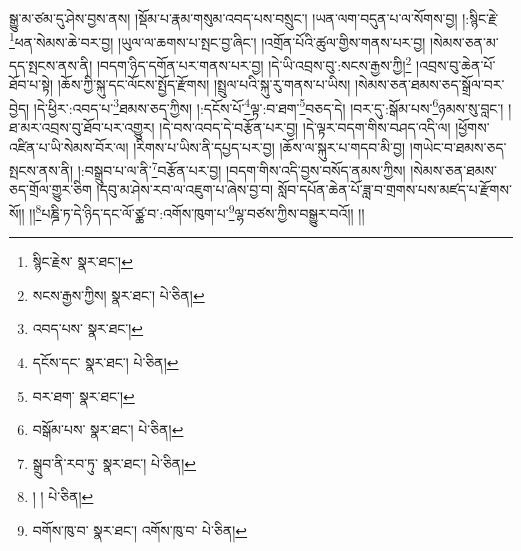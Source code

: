 སྒྱུ་མ་ཙམ་དུ་ཤེས་བྱས་ནས། །སྡོམ་པ་རྣམ་གསུམ་འབད་པས་བསྲུང་། །ཡན་ལག་བདུན་པ་ལ་སོགས་བྱ། །:སྙིང་རྗེ་\footnote{སྙིང་རྗེས་  སྣར་ཐང་། }ཕན་སེམས་ཆེ་བར་བྱ། །ཡུལ་ལ་ཆགས་པ་སྤང་བྱ་ཞིང་། །འགྲོན་པོའི་ཚུལ་གྱིས་གནས་པར་བྱ། །སེམས་ཅན་མ་དད་སྤངས་ནས་ནི། །བདག་ཉིད་དགོན་པར་གནས་པར་བྱ། །དེ་ཡི་འབྲས་བུ་:སངས་རྒྱས་ཀྱི།\footnote{སངས་རྒྱས་ཀྱིས།  སྣར་ཐང་།  པེ་ཅིན། } །འབྲས་བུ་ཆེན་པོ་ཐོབ་པ་སྟེ། །ཆོས་ཀྱི་སྐུ་དང་ལོངས་སྤྱོད་རྫོགས། །སྤྲུལ་པའི་སྐུ་རུ་གནས་པ་ཡིས། །སེམས་ཅན་ཐམས་ཅད་སྒྲོལ་བར་བྱེད། །དེ་ཕྱིར་:འབད་པ་\footnote{འབད་པས་  སྣར་ཐང་། }ཐམས་ཅད་ཀྱིས། །:དངོས་པོ་\footnote{དངོས་དང་  སྣར་ཐང་།  པེ་ཅིན། }ལྟ་:བ་ཐག་\footnote{བར་ཐག་  སྣར་ཐང་། }བཅད་དེ། །བར་དུ་:སྒོམ་པས་\footnote{བསྒོམ་པས་  སྣར་ཐང་།  པེ་ཅིན། }ཉམས་སུ་བླང་། །ཐ་མར་འབྲས་བུ་ཐོབ་པར་འགྱུར། །དེ་བས་འབད་དེ་བརྩོན་པར་བྱ། །དེ་ལྟར་བདག་གིས་བཤད་འདི་ལ། །ཕྱོགས་འཛིན་པ་ཡི་སེམས་བོར་ལ། །རིགས་པ་ཡིས་ནི་དཔྱད་པར་བྱ། །ཆོས་ལ་སྐུར་པ་གདབ་མི་བྱ། །གཡེང་བ་ཐམས་ཅད་སྤངས་ནས་ནི། །:བསྒྲུབ་པ་ལ་ནི་\footnote{སྒྲུབ་ནི་རབ་ཏུ་  སྣར་ཐང་།  པེ་ཅིན། }བརྩོན་པར་བྱ། །བདག་གིས་འདི་བྱས་བསོད་ནམས་ཀྱིས། །སེམས་ཅན་ཐམས་ཅད་གྲོལ་གྱུར་ཅིག །དབུ་མ་ཤེས་རབ་ལ་འཇུག་པ་ཞེས་བྱ་བ། སློབ་དཔོན་ཆེན་པོ་ཟླ་བ་གྲགས་པས་མཛད་པ་རྫོགས་སོ།། །།\footnote{། །  པེ་ཅིན། }པཎྜི་ཏ་དེ་ཉིད་དང་ལོ་ཙྪ་བ་:འགོས་ཁུག་པ་\footnote{བགོས་ཁུ་བ་  སྣར་ཐང་། འགོས་ཁུ་བ་  པེ་ཅིན། }ལྷ་བཙས་ཀྱིས་བསྒྱུར་བའོ།། །།
